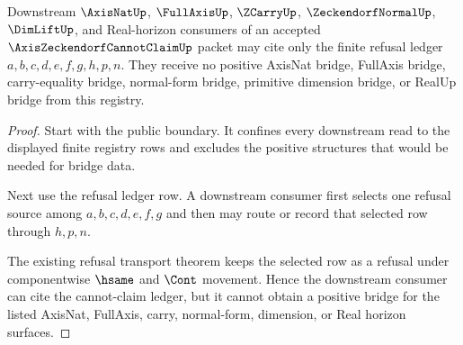 \begin{theorem}
\label{thm:axis-zeckendorf-cannot-claim-downstream-unblock}
Downstream $\AxisNatUp$, $\FullAxisUp$, $\ZCarryUp$, $\ZeckendorfNormalUp$, $\DimLiftUp$, and Real-horizon consumers of an accepted $\AxisZeckendorfCannotClaimUp$ packet may cite only the finite refusal ledger $a,b,c,d,e,f,g,h,p,n$. They receive no positive AxisNat bridge, FullAxis bridge, carry-equality bridge, normal-form bridge, primitive dimension bridge, or RealUp bridge from this registry.
\end{theorem}
\begin{proof}
Start with the public boundary. It confines every downstream read to the displayed finite registry rows and excludes the positive structures that would be needed for bridge data.

Next use the refusal ledger row. A downstream consumer first selects one refusal source among $a,b,c,d,e,f,g$ and then may route or record that selected row through $h,p,n$.

The existing refusal transport theorem keeps the selected row as a refusal under componentwise $\hsame$ and $\Cont$ movement. Hence the downstream consumer can cite the cannot-claim ledger, but it cannot obtain a positive bridge for the listed AxisNat, FullAxis, carry, normal-form, dimension, or Real horizon surfaces.
\end{proof}

